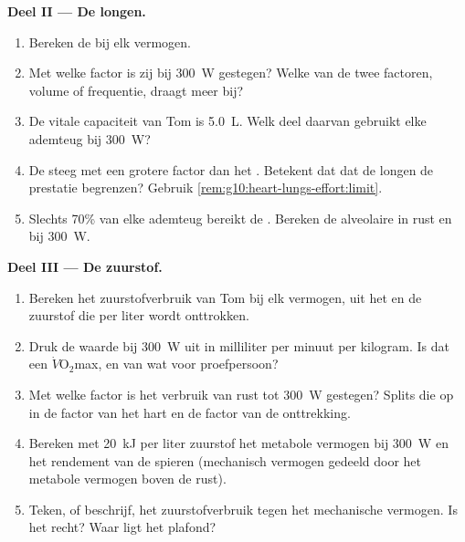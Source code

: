 \begin{problem}
\medskip
\noindent\textbf{Deel II --- De longen.}
\begin{enumerate}[resume]
  \item Bereken de  bij elk vermogen.
  \item Met welke factor is zij bij \qty{300}{W} gestegen? Welke van de
        twee factoren, volume of frequentie, draagt meer bij?
  \item De vitale capaciteit van Tom is \qty{5.0}{L}. Welk deel daarvan
        gebruikt elke ademteug bij \qty{300}{W}?
  \item De  steeg met een grotere factor dan het
        . Betekent dat dat de longen de prestatie
        begrenzen? Gebruik \cref{rem:g10:heart-lungs-effort:limit}.
  \item Slechts 70\% van elke ademteug bereikt de . Bereken
        de alveolaire  in rust en bij \qty{300}{W}.
\end{enumerate}

\medskip
\noindent\textbf{Deel III --- De zuurstof.}
\begin{enumerate}[resume]
  \item Bereken het zuurstofverbruik van Tom bij elk vermogen, uit het
         en de zuurstof die per liter wordt onttrokken.
  \item Druk de waarde bij \qty{300}{W} uit in milliliter per minuut per
        kilogram. Is dat een $\dot V\!\mathrm{O_2}$max, en van wat voor
        proefpersoon?
  \item Met welke factor is het verbruik van rust tot \qty{300}{W}
        gestegen? Splits die op in de factor van het hart en de factor van
        de onttrekking.
  \item Bereken met \qty{20}{kJ} per liter zuurstof het metabole vermogen
        bij \qty{300}{W} en het rendement van de spieren (mechanisch
        vermogen gedeeld door het metabole vermogen boven de rust).
  \item Teken, of beschrijf, het zuurstofverbruik tegen het mechanische
        vermogen. Is het recht? Waar ligt het plafond?
\end{enumerate}


\end{problem}
